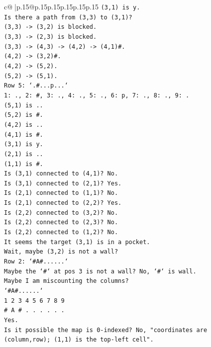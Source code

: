 \documentclass{article}
\begin{document}
{\begin{supertabular}{c@{$\;$}|p{.15\linewidth}@{}p{.15\linewidth}p{.15\linewidth}p{.15\linewidth}p{.15\linewidth}p{.15\linewidth}}
{{{\texttt{(3,1) is y.} \\
\texttt{Is there a path from (3,3) to (3,1)?} \\
\texttt{(3,3) {-}> (3,2) is blocked.} \\
\texttt{(3,3) {-}> (2,3) is blocked.} \\
\texttt{(3,3) {-}> (4,3) {-}> (4,2) {-}> (4,1)\#.} \\
\texttt{(4,2) {-}> (3,2)\#.} \\
\texttt{(4,2) {-}> (5,2).} \\
\texttt{(5,2) {-}> (5,1).} \\
\texttt{Row 5: `.\#...p...`} \\
\texttt{1: ., 2: \#, 3: ., 4: ., 5: ., 6: p, 7: ., 8: ., 9: .} \\
\texttt{(5,1) is ..} \\
\texttt{(5,2) is \#.} \\
\texttt{(4,2) is ..} \\
\texttt{(4,1) is \#.} \\
\texttt{(3,1) is y.} \\
\texttt{(2,1) is ..} \\
\texttt{(1,1) is \#.} \\
\texttt{Is (3,1) connected to (4,1)? No.} \\
\texttt{Is (3,1) connected to (2,1)? Yes.} \\
\texttt{Is (2,1) connected to (1,1)? No.} \\
\texttt{Is (2,1) connected to (2,2)? Yes.} \\
\texttt{Is (2,2) connected to (3,2)? No.} \\
\texttt{Is (2,2) connected to (2,3)? No.} \\
\texttt{Is (2,2) connected to (1,2)? No.} \\
\texttt{It seems the target (3,1) is in a pocket.} \\
\texttt{Wait, maybe (3,2) is not a wall?} \\
\texttt{Row 2: `\#A\#......`} \\
\texttt{Maybe the `\#` at pos 3 is not a wall? No, `\#` is wall.} \\
\texttt{Maybe I am miscounting the columns?} \\
\texttt{`\#A\#......`} \\
\texttt{1 2 3 4 5 6 7 8 9} \\
\texttt{\# A \# . . . . . .} \\
\texttt{Yes.} \\
\texttt{Is it possible the map is 0{-}indexed? No, "coordinates are (column,row); (1,1) is the top{-}left cell".} \\
}}}
\end{supertabular}}
\end{document}
